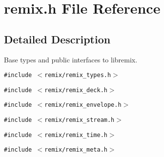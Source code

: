 \section{remix.h File Reference}
\label{remix_8h}


\subsection{Detailed Description}
Base types and public interfaces to libremix. 



{\tt \#include $<$remix/remix\_\-types.h$>$}\par
{\tt \#include $<$remix/remix\_\-deck.h$>$}\par
{\tt \#include $<$remix/remix\_\-envelope.h$>$}\par
{\tt \#include $<$remix/remix\_\-stream.h$>$}\par
{\tt \#include $<$remix/remix\_\-time.h$>$}\par
{\tt \#include $<$remix/remix\_\-meta.h$>$}\par
